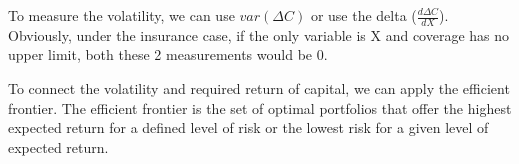 \documentclass[
]{article}
\begin{document}
To measure the volatility, we can use \(var(\Delta C)\) or use the delta
(\(\frac{d\Delta C}{dX}\)). Obviously, under the insurance case, if the
only variable is X and coverage has no upper limit, both these 2
measurements would be 0.

To connect the volatility and required return of capital, we can apply
the efficient frontier. The efficient frontier is the set of optimal
portfolios that offer the highest expected return for a defined level of
risk or the lowest risk for a given level of expected return.
\end{document}
